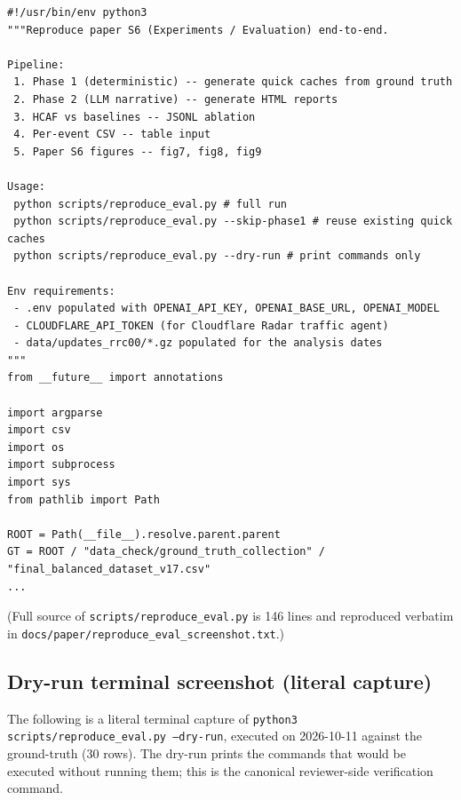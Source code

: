 \documentclass[sigcomm,nonatbib]{acmart}
\begin{document}
\begin{verbatim}
#!/usr/bin/env python3
"""Reproduce paper S6 (Experiments / Evaluation) end-to-end.

Pipeline:
 1. Phase 1 (deterministic) -- generate quick caches from ground truth
 2. Phase 2 (LLM narrative) -- generate HTML reports
 3. HCAF vs baselines -- JSONL ablation
 4. Per-event CSV -- table input
 5. Paper S6 figures -- fig7, fig8, fig9

Usage:
 python scripts/reproduce_eval.py # full run
 python scripts/reproduce_eval.py --skip-phase1 # reuse existing quick caches
 python scripts/reproduce_eval.py --dry-run # print commands only

Env requirements:
 - .env populated with OPENAI_API_KEY, OPENAI_BASE_URL, OPENAI_MODEL
 - CLOUDFLARE_API_TOKEN (for Cloudflare Radar traffic agent)
 - data/updates_rrc00/*.gz populated for the analysis dates
"""
from __future__ import annotations

import argparse
import csv
import os
import subprocess
import sys
from pathlib import Path

ROOT = Path(__file__).resolve.parent.parent
GT = ROOT / "data_check/ground_truth_collection" / "final_balanced_dataset_v17.csv"
...
\end{verbatim}

\noindent (Full source of \texttt{scripts/reproduce\_eval.py} is
146 lines and reproduced verbatim in
\texttt{docs/paper/reproduce\_eval\_screenshot.txt}.)

\subsection{Dry-run terminal screenshot (literal capture)}

\noindent The following is a literal terminal capture of
\texttt{python3 scripts/reproduce\_eval.py --dry-run}, executed on
2026-10-11 against the ground-truth (30 rows). The dry-run
prints the commands that would be executed without running them; this
is the canonical reviewer-side verification command.
\end{document}

